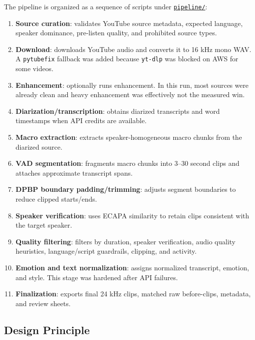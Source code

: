 \documentclass[11pt]{article}
\begin{document}
The pipeline is organized as a sequence of scripts under \href{https://github.com/Rushabh333/sarvam-indian-tts-pipeline/tree/main/pipeline}{\texttt{pipeline/}}:

\begin{enumerate}
    \item \textbf{Source curation}: validates YouTube source metadata, expected language, speaker dominance, pre-listen quality, and prohibited source types.
    \item \textbf{Download}: downloads YouTube audio and converts it to 16 kHz mono WAV. A \texttt{pytubefix} fallback was added because \texttt{yt-dlp} was blocked on AWS for some videos.
    \item \textbf{Enhancement}: optionally runs enhancement. In this run, most sources were already clean and heavy enhancement was effectively not the measured win.
    \item \textbf{Diarization/transcription}: obtains diarized transcripts and word timestamps when API credits are available.
    \item \textbf{Macro extraction}: extracts speaker-homogeneous macro chunks from the diarized source.
    \item \textbf{VAD segmentation}: fragments macro chunks into 3--30 second clips and attaches approximate transcript spans.
    \item \textbf{DPBP boundary padding/trimming}: adjusts segment boundaries to reduce clipped starts/ends.
    \item \textbf{Speaker verification}: uses ECAPA similarity to retain clips consistent with the target speaker.
    \item \textbf{Quality filtering}: filters by duration, speaker verification, audio quality heuristics, language/script guardrails, clipping, and activity.
    \item \textbf{Emotion and text normalization}: assigns normalized transcript, emotion, and style. This stage was hardened after API failures.
    \item \textbf{Finalization}: exports final 24 kHz clips, matched raw before-clips, metadata, and review sheets.
\end{enumerate}

\subsection{Design Principle}
\end{document}
